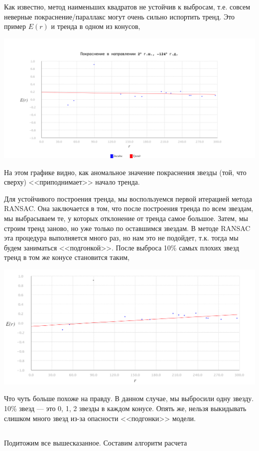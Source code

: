 \documentclass[14pt]{article}
\begin{document}
                Как известно, метод наименьших квадратов не устойчив к выбросам, т.е. совсем неверные покраснение/параллакс могут очень сильно испортить тренд. Это пример $E(r)$ и тренда в одном из конусов, 
                \begin{center}
                    \includegraphics[scale=0.35]{ls.png}
                \end{center}
                
                На этом графике видно, как аномальное значение покраснения звезды (той, что сверху) <<приподнимает>> начало тренда.
                
                
                Для устойчивого построения тренда, мы воспользуемся первой итерацией метода RANSAC. Она заключается в том, что после построения тренда по всем звездам, мы выбрасываем те, у которых отклонение от тренда самое большое. Затем, мы строим тренд заново, но уже только по оставшимся звездам. В методе RANSAC эта процедура выполняется много раз, но нам это не подойдет, т.к. тогда мы будем заниматься <<подгонкой>>. После выброса 10\% самых плохих звезд тренд в том же конусе становится таким,
                \begin{center}
                    \includegraphics[scale=0.4]{ransac.png}
                \end{center} 
                
                Что чуть больше похоже на правду. В данном случае, мы выбросили одну звезду. 10\% звезд --- это 0, 1, 2 звезды в каждом конусе. Опять же, нельзя выкидывать слишком много звезд из-за опасности <<подгонки>> модели.     
                
        \subsection{}
            Подитожим все вышесказанное. Составим алгоритм расчета             
                
    

    
\end{document}
